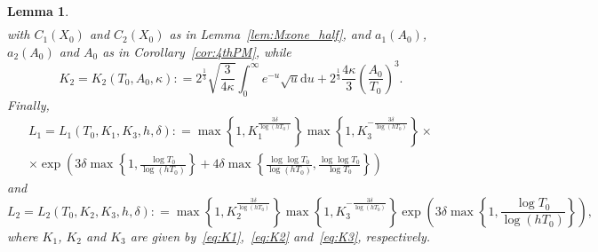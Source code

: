 \documentclass[a4paper,reqno]{amsart}
\newtheorem{lemma}[theorem]{Lemma}
\theoremstyle{definition}
\newcommand{\de}[0]{\mathrel{\mathop:}=}
\newcommand{\dif}[1]{\mathrm{d}#1}
\begin{document}
\begin{lemma}
\begin{multline}
\end{multline}
with $C_1(X_0)$ and $C_2(X_0)$ as in Lemma~\ref{lem:Mxone_half}, and $a_1(A_0)$, $a_2(A_0)$ and $A_0$ as in Corollary~\ref{cor:4thPM}, while
\begin{equation}
\label{eq:K2}
K_2=K_2(T_0,A_0,\kappa) \de 2^{\frac{1}{3}}\sqrt{\frac{3}{4\kappa}}\int_{0}^{\infty}e^{-u}\sqrt{u}\dif{u} + 2^{\frac{1}{3}}\frac{4\kappa}{3}\left(\frac{A_0}{T_0}\right)^{3}.
\end{equation}
Finally,
\begin{multline}
\label{eq:L1}
L_1 = L_1(T_0,K_1,K_3,h,\delta)
\de \max\left\{1,K_1^{\frac{3\delta}{\log{(hT_0)}}}\right\}\max\left\{1,K_3^{-\frac{3\delta}{\log{(hT_0)}}}\right\}\times \\
\times\exp{\left(3\delta\max\left\{1,\frac{\log{T_0}}{\log{(hT_0)}}\right\}+4\delta\max\left\{\frac{\log{\log{T_0}}}{\log{(hT_0)}},\frac{\log{\log{T_0}}}{\log{T_0}}\right\}\right)}
\end{multline}
and
\begin{equation}
\label{eq:L2}
L_2 = L_2(T_0,K_2,K_3,h,\delta) \de \max\left\{1,K_2^{\frac{3\delta}{\log{(hT_0)}}}\right\}\max\left\{1,K_3^{-\frac{3\delta}{\log{(hT_0)}}}\right\}\exp{\left(3\delta\max\left\{1,\frac{\log{T_0}}{\log{(hT_0)}}\right\}\right)},
\end{equation}
where $K_1$, $K_2$ and $K_3$ are given by~\eqref{eq:K1},~\eqref{eq:K2} and~\eqref{eq:K3}, respectively.
\end{lemma}
\end{document}
